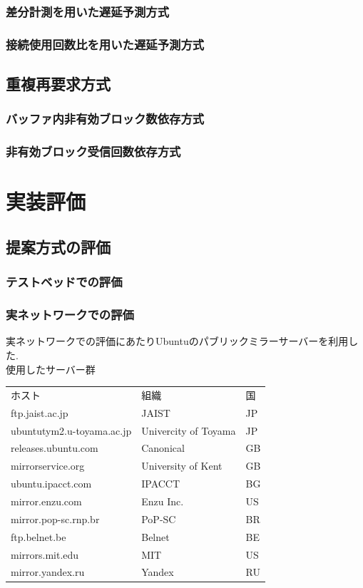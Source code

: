 \documentclass[a4j,12pt]{gradthesis_utf8}
\begin{document}
\subsection{差分計測を用いた遅延予測方式}
\label{diff}


\subsection{接続使用回数比を用いた遅延予測方式}
\label{inv}

\section{重複再要求方式}
\subsection{バッファ内非有効ブロック数依存方式}
\subsection{非有効ブロック受信回数依存方式}

\chapter{実装評価}\label{sec:sec4}

\section{提案方式の評価}
\subsection{テストベッドでの評価}

\subsection{実ネットワークでの評価}
実ネットワークでの評価にあたりUbuntuのパブリックミラーサーバーを利用した.\\
使用したサーバー群
\begin{table}[htb]
	\begin{tabular}{lll}
		ホスト & 組織 & 国\\
		ftp.jaist.ac.jp & JAIST & JP \\
		ubuntutym2.u-toyama.ac.jp & Univercity of Toyama & JP \\
		releases.ubuntu.com & Canonical & GB \\
		mirrorservice.org & University of Kent & GB \\
		ubuntu.ipacct.com & IPACCT & BG \\
		mirror.enzu.com & Enzu Inc. & US \\
		mirror.pop-sc.rnp.br & PoP-SC & BR \\
		ftp.belnet.be & Belnet & BE \\
		mirrors.mit.edu & MIT & US \\
		mirror.yandex.ru & Yandex & RU \\
	\end{tabular}
\end{table}
\end{document}
